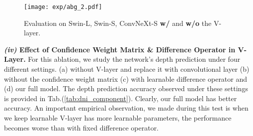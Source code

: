 \documentclass{article} \usepackage{iclr2023_conference, times}
\newcommand{\formattedparagraph}[1]{\noindent \textbf{#1}}
\begin{document}
\begin{wrapfigure}{rt}{0.34\textwidth}
\vspace{-20pt}
  \begin{center}
    \texttt{[image: exp/abg\_2.pdf]}
    \vspace{-10pt}
    \caption{\scriptsize Evaluation on Swin-L, Swin-S, ConvNeXt-S \textbf{w/} and \textbf{w/o} the V-layer. }
    \label{fig:ablation_bone}
  \end{center}
  \vspace{-20pt}
\end{wrapfigure} 







\formattedparagraph{\textit{(iv)} Effect of Confidence Weight Matrix \& Difference Operator in V-Layer.} For this ablation, we study the network's depth prediction under four different settings. (a) without V-layer and replace it with convolutional layer (b) without the confidence weight matrix (c) with learnable difference operator and (d) our full model. The depth prediction accuracy observed under these settings is provided in Tab.(\ref{tab:dni_component}). Clearly, our full model has better accuracy. An important empirical observation, we made during this test is when we keep  learnable V-layer has more learnable parameters, the performance becomes worse than with fixed difference operator.
\end{document}
